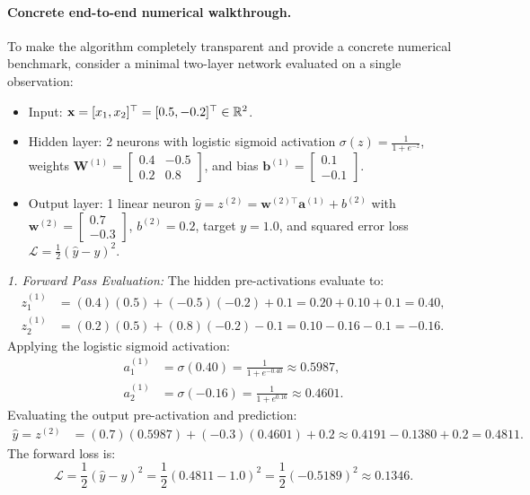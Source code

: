 \paragraph{Concrete end-to-end numerical walkthrough.}
To make the algorithm completely transparent and provide a concrete numerical benchmark, consider a minimal two-layer network evaluated on a single observation:
\begin{itemize}[noitemsep,topsep=2pt,parsep=0pt,partopsep=0pt]
  \item Input: $\mathbf{x} = [x_1, x_2]^\top = [0.5, -0.2]^\top \in \mathbb{R}^2$.
  \item Hidden layer: 2 neurons with logistic sigmoid activation $\sigma(z) = \frac{1}{1 + e^{-z}}$, weights $\mathbf{W}^{(1)} = \begin{bmatrix} 0.4 & -0.5 \\ 0.2 & 0.8 \end{bmatrix}$, and bias $\mathbf{b}^{(1)} = \begin{bmatrix} 0.1 \\ -0.1 \end{bmatrix}$.
  \item Output layer: 1 linear neuron $\hat{y} = z^{(2)} = \mathbf{w}^{(2)\top} \mathbf{a}^{(1)} + b^{(2)}$ with $\mathbf{w}^{(2)} = \begin{bmatrix} 0.7 \\ -0.3 \end{bmatrix}$, $b^{(2)} = 0.2$, target $y = 1.0$, and squared error loss $\mathcal{L} = \frac{1}{2}(\hat{y} - y)^2$.
\end{itemize}

\textit{1. Forward Pass Evaluation:}
The hidden pre-activations evaluate to:
\begin{align}
z_1^{(1)} &= (0.4)(0.5) + (-0.5)(-0.2) + 0.1 = 0.20 + 0.10 + 0.1 = 0.40, \nonumber \\
z_2^{(1)} &= (0.2)(0.5) + (0.8)(-0.2) - 0.1 = 0.10 - 0.16 - 0.1 = -0.16.
\end{align}
Applying the logistic sigmoid activation:
\begin{align}
a_1^{(1)} &= \sigma(0.40) = \frac{1}{1 + e^{-0.40}} \approx 0.5987, \nonumber \\
a_2^{(1)} &= \sigma(-0.16) = \frac{1}{1 + e^{0.16}} \approx 0.4601.
\end{align}
Evaluating the output pre-activation and prediction:
\begin{align}
\hat{y} = z^{(2)} &= (0.7)(0.5987) + (-0.3)(0.4601) + 0.2 \approx 0.4191 - 0.1380 + 0.2 = 0.4811.
\end{align}
The forward loss is:
\begin{equation}
\mathcal{L} = \frac{1}{2}(\hat{y} - y)^2 = \frac{1}{2}(0.4811 - 1.0)^2 = \frac{1}{2}(-0.5189)^2 \approx 0.1346.
\end{equation}

